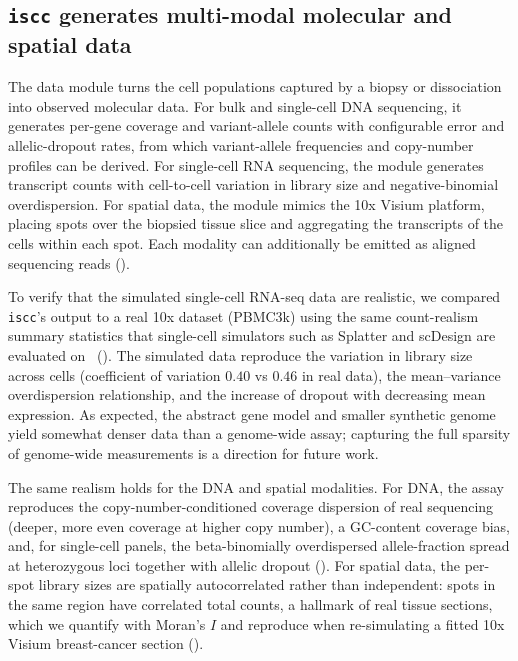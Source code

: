 \documentclass{article}
\begin{document}
\subsection{\texttt{iscc} generates multi-modal molecular and spatial data}
\label{sec:data}
The data module turns the cell populations captured by a biopsy or dissociation into observed
molecular data. For bulk and single-cell DNA sequencing, it generates per-gene coverage and
variant-allele counts with configurable error and allelic-dropout rates, from which
variant-allele frequencies and copy-number profiles can be derived. For single-cell RNA
sequencing, the module generates transcript counts with cell-to-cell variation in library size
and negative-binomial overdispersion. For spatial data, the module mimics the 10x Visium
platform, placing spots over the biopsied tissue slice and aggregating the transcripts of the
cells within each spot. Each modality can additionally be emitted as aligned sequencing reads
().

To verify that the simulated single-cell RNA-seq data are realistic, we compared \texttt{iscc}'s
output to a real 10x dataset (PBMC3k) using the same count-realism summary statistics that
single-cell simulators such as Splatter and scDesign are evaluated
on~\cite{zappia_splatter_2017, song_scdesign3_2024} (). The simulated
data reproduce the variation in library size
across cells (coefficient of variation $0.40$ vs $0.46$ in real data), the mean--variance
overdispersion relationship, and the increase of dropout with decreasing mean expression. As
expected, the abstract gene model and smaller synthetic genome yield somewhat denser data than
a genome-wide assay; capturing the full sparsity of genome-wide measurements is a direction for
future work.

The same realism holds for the DNA and spatial modalities. For DNA, the assay reproduces the
copy-number-conditioned coverage dispersion of real sequencing (deeper, more even coverage at
higher copy number), a GC-content coverage bias, and, for single-cell panels, the
beta-binomially overdispersed allele-fraction spread at heterozygous loci together with allelic
dropout (). For spatial data, the per-spot library sizes are spatially
autocorrelated rather than independent: spots in the same region have correlated total counts, a
hallmark of real tissue sections, which we quantify with Moran's $I$ and reproduce when
re-simulating a fitted 10x Visium breast-cancer section ().
\end{document}
